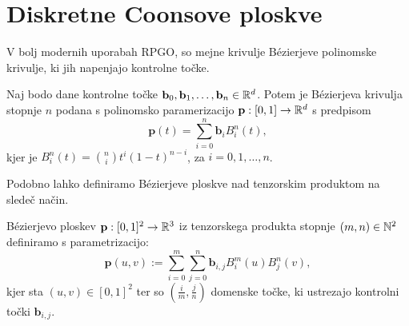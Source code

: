 \documentclass[a4paper,12pt]{article}
\begin{document}
\section{Diskretne Coonsove ploskve}
V bolj modernih uporabah RPGO, so mejne krivulje Bézierjeve polinomske krivulje, 
ki jih napenjajo kontrolne točke. 
\begin{definicija}
    Naj bodo dane kontrolne točke $\mathbf{b}_0, \mathbf{b}_1, \dots, \mathbf{b}_n \in \mathbb{R}^d$. 
    Potem je Bézierjeva krivulja stopnje $n$ podana s polinomsko paramerizacijo $\mathbf{p}: [0,1] \rightarrow \mathbb{R}^d$ s predpisom 
    $$\mathbf{p}(t) = \sum_{i=0}^n \mathbf{b}_{i} B_i^n(t),$$
    kjer je $B_i^n(t) = \binom{n}{i} t^i (1-t)^{n-i}$, za $i = 0, 1,\dots,n$. 
\end{definicija}

Podobno lahko definiramo Bézierjeve ploskve nad tenzorskim produktom
na sledeč način.

\begin{definicija}
    Bézierjevo ploskev $\mathbf{p} : [0,1]^2 \rightarrow \mathbb{R}^3$ iz tenzorskega produkta stopnje 
    $(m, n) \in \mathbb{N}^2$ definiramo s parametrizacijo:
    $$\mathbf{p}(u,v) := \sum_{i=0}^m \sum_{j=0}^n \mathbf{b}_{i,j} B_i^m(u)B_j^n(v),$$
    kjer sta $(u,v) \in [0,1]^2$ ter so $(\frac{i}{m}, \frac{j}{n})$
    domenske točke, ki ustrezajo kontrolni točki $\mathbf{b}_{i,j}$.
\end{definicija}
\end{document}
